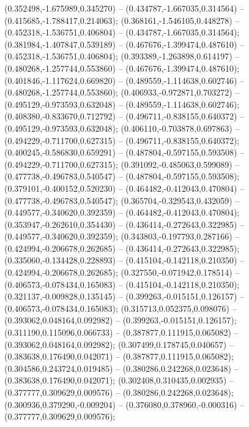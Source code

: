  (0.352498,-1.675989,0.345270) -- (0.434787,-1.667035,0.314564) -- (0.415685,-1.788417,0.214063);
 (0.368161,-1.546105,0.448278) -- (0.452318,-1.536751,0.406804) -- (0.434787,-1.667035,0.314564);
 (0.381984,-1.407847,0.539189) -- (0.467676,-1.399474,0.487610) -- (0.452318,-1.536751,0.406804);
 (0.393389,-1.263898,0.614197) -- (0.480268,-1.257744,0.553860) -- (0.467676,-1.399474,0.487610);
 (0.401846,-1.117624,0.669820) -- (0.489559,-1.114638,0.602746) -- (0.480268,-1.257744,0.553860);
 (0.406933,-0.972871,0.703272) -- (0.495129,-0.973593,0.632048) -- (0.489559,-1.114638,0.602746);
 (0.408380,-0.833670,0.712792) -- (0.496711,-0.838155,0.640372) -- (0.495129,-0.973593,0.632048);
 (0.406110,-0.703878,0.697863) -- (0.494229,-0.711700,0.627315) -- (0.496711,-0.838155,0.640372);
 (0.400245,-0.586830,0.659291) -- (0.487804,-0.597155,0.593508) -- (0.494229,-0.711700,0.627315);
 (0.391092,-0.485063,0.599089) -- (0.477738,-0.496783,0.540547) -- (0.487804,-0.597155,0.593508);
 (0.379101,-0.400152,0.520230) -- (0.464482,-0.412043,0.470804) -- (0.477738,-0.496783,0.540547);
 (0.365704,-0.329543,0.432059) -- (0.449577,-0.340620,0.392359) -- (0.464482,-0.412043,0.470804);
 (0.353947,-0.262610,0.354430) -- (0.436414,-0.272643,0.322985) -- (0.449577,-0.340620,0.392359);
 (0.343803,-0.197793,0.287166) -- (0.424994,-0.206678,0.262685) -- (0.436414,-0.272643,0.322985);
 (0.335060,-0.134428,0.228893) -- (0.415104,-0.142118,0.210350) -- (0.424994,-0.206678,0.262685);
 (0.327550,-0.071942,0.178514) -- (0.406573,-0.078434,0.165083) -- (0.415104,-0.142118,0.210350);
 (0.321137,-0.009828,0.135145) -- (0.399263,-0.015151,0.126157) -- (0.406573,-0.078434,0.165083);
 (0.315713,0.052375,0.098076) -- (0.393062,0.048164,0.092982) -- (0.399263,-0.015151,0.126157);
 (0.311190,0.115096,0.066733) -- (0.387877,0.111915,0.065082) -- (0.393062,0.048164,0.092982);
 (0.307499,0.178745,0.040657) -- (0.383638,0.176490,0.042071) -- (0.387877,0.111915,0.065082);
 (0.304586,0.243724,0.019485) -- (0.380286,0.242268,0.023648) -- (0.383638,0.176490,0.042071);
 (0.302408,0.310435,0.002935) -- (0.377777,0.309629,0.009576) -- (0.380286,0.242268,0.023648);
 (0.300936,0.379290,-0.009204) -- (0.376080,0.378960,-0.000316) -- (0.377777,0.309629,0.009576);
